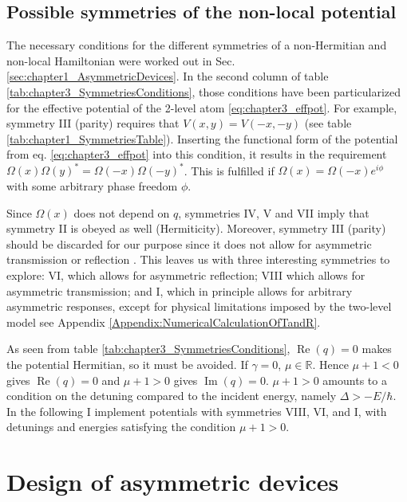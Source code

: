 \subsection{Possible symmetries of the non-local potential}
%
The necessary conditions for the different symmetries of a non-Hermitian and non-local Hamiltonian were worked out in Sec. \ref{sec:chapter1_AsymmetricDevices}. In the second column of table \ref{tab:chapter3_SymmetriesConditions}, those conditions have been particularized for the effective potential of the 2-level atom \eqref{eq:chapter3_effpot}. For example, symmetry III (parity) requires that $V(x,y)=V(-x,-y)$ (see table \ref{tab:chapter1_SymmetriesTable}). Inserting the functional form of the potential from eq. \eqref{eq:chapter3_effpot} into this condition, it results in the requirement $\Omega(x) \Omega(y)^* = \Omega(-x) \Omega(-y)^*$. This is fulfilled if $\Omega(x)=\Omega(-x)e^{i \phi}$ with some arbitrary phase freedom $\phi$.

Since $\Omega(x)$ does not depend on $q$, symmetries IV, V and VII imply that symmetry II is obeyed as well (Hermiticity).
Moreover, symmetry III (parity) should be discarded for our purpose since it does not allow for asymmetric transmission or reflection
\cite{Ruschhaupt2017}.
This leaves us with three interesting symmetries to explore:
VI, which allows for  asymmetric reflection; VIII which allows for asymmetric transmission; and  I,
which in principle allows for arbitrary asymmetric responses, except for physical limitations imposed by
the two-level model see Appendix \ref{Appendix:NumericalCalculationOfTandR}.

As seen from  table \ref{tab:chapter3_SymmetriesConditions}, $\operatorname{Re}(q)=0$ makes the potential Hermitian, so it must be avoided.
If $\gamma=0$,   $\mu \in \mathbb{R}$. Hence $\mu+1<0$ gives $\operatorname{Re}(q)=0$ and $\mu+1>0$ gives
$\operatorname{Im}(q)=0$. $\mu+1>0$ amounts to a condition on the detuning compared to the incident energy, namely $\Delta>-E/\hbar$.
In the following I implement potentials with symmetries VIII, VI, and I, with detunings and energies satisfying the condition $\mu+1>0$.


\section{Design of asymmetric devices\label{sec:chapter3_exa}}

